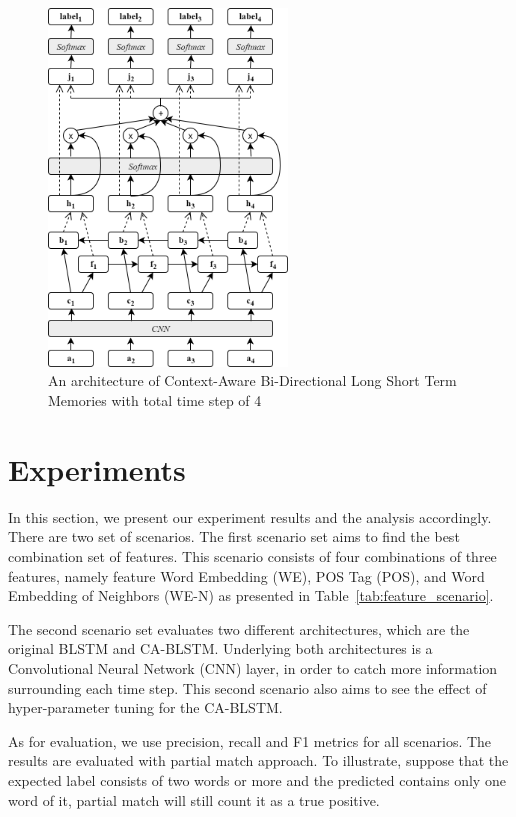 \begin{figure}
	\includegraphics[width=2.5in]{cabilstm}
	\caption{An architecture of Context-Aware Bi-Directional Long Short Term Memories with total time step of 4}
	\label{fig:cabilstm}
\end{figure}

\section{Experiments}
In this section, we present our experiment results and the analysis accordingly. There are two set of scenarios. The first scenario set aims to find the best combination set of features. This scenario consists of four combinations of three features, namely feature Word Embedding (WE), POS Tag (POS), and Word Embedding of Neighbors (WE-N) as presented in Table~\ref{tab:feature_scenario}.

The second scenario set evaluates two different architectures, which are the original BLSTM and CA-BLSTM. Underlying both architectures is a Convolutional Neural Network (CNN) layer, in order to catch more information surrounding each time step. This second scenario also aims to see the effect of hyper-parameter tuning for the CA-BLSTM.

As for evaluation, we use precision, recall and F1 metrics for all scenarios. The results are evaluated with partial match approach. To illustrate, suppose that the expected label consists of two words or more and the predicted contains only one word of it, partial match will still count it as a true positive.

